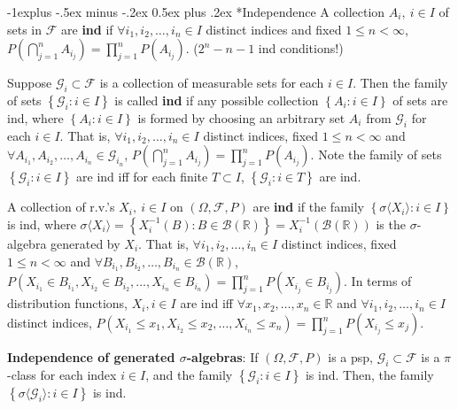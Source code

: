 \documentclass[paper=letter,fontsize=2.89mm]{scrartcl}
\makeatletter
\newcommand{\Borel}{\mathcal{B}}
\newcommand{\R}{\mathbb{R}}
\newcommand\set[1]{\left\{ #1 \right\}}
\renewcommand{\subsection}{\@startsection{subsection}{2}{0mm}%
                                {-1explus -.5ex minus -.2ex}%
                                {0.5ex plus .2ex}%
                                {\normalfont\normalsize\bfseries}}
\makeatother
\begin{document}
\begin{multicols*}{3}
\subsection*{Independence}
A collection $A_i, ~i \in I$ of sets in $\mathcal{F}$ are \textbf{ind} if $\forall i_1, i_2, \dots, i_n \in I$ distinct indices and fixed $1 \le n < \infty$,
$P\left(\bigcap_{j=1}^n A_{i_j}\right) = \prod_{j=1}^n P\left(A_{i_j}\right).$ ($2^n -n -1$ ind conditions!) \\ \medskip

Suppose $\mathcal{G}_i \subset \mathcal{F}$ is a collection of measurable sets for each $i \in I$. Then the family of sets $\set{\mathcal{G}_i : i \in I}$ is called \textbf{ind} if any possible collection $\set{A_i: i \in I}$ of sets are ind, where $\set{A_i:i \in I}$ is formed by choosing an arbitrary set $A_i$ from $\mathcal{G}_i$ for each $i \in I$. That is, $\forall i_1, i_2, \dots, i_n \in I$ distinct indices, fixed $1 \le n < \infty$ and $\forall A_{i_1}, A_{i_2}, \dots, A_{i_n} \in \mathcal{G}_{i_n}$, $P\left(\bigcap_{j=1}^n A_{i_j}\right) = \prod_{j=1}^n P\left(A_{i_j}\right).$ Note the family of sets $\set{\mathcal{G}_i: i \in I}$ are ind iff for each finite $T \subset I$, $\set{\mathcal{G}_i:i \in T}$ are ind. \\ \medskip

A collection of r.v.\@'s $X_i, ~i \in I$ on $(\Omega, \mathcal{F}, P)$ are \textbf{ind} if the family $\set{\sigma\langle X_i \rangle: i \in I}$ is ind, where 
$\sigma\langle X_i \rangle = \set{X_i^{-1}(B): B \in \Borel(\R)} = X_i^{-1} (\Borel(\R))$
is the $\sigma$-algebra generated by $X_i$. That is, $\forall i_1, i_2, \dots, i_n \in I$ distinct indices, fixed $1 \le n < \infty$ and $\forall B_{i_1}, B_{i_2}, \dots, B_{i_n} \in \Borel(\R)$,
$P\left(X_{i_1} \in B_{i_1}, X_{i_2} \in B_{i_2}, \dots, X_{i_n} \in B_{i_n}\right) = \prod_{j=1}^n P\left(X_{i_j}\in B_{i_j}\right).$
In terms of distribution functions, $X_i, i \in I$ are ind iff  $\forall x_1, x_2, \dots, x_n \in \R$ and $\forall i_1, i_2, \dots, i_n \in I$ distinct indices,
$P\left(X_{i_1} \le x_1, X_{i_2} \le x_2, \dots, X_{i_n} \le x_n \right) = \prod_{j=1}^n P\left(X_{i_j}\le x_j\right).$ \\ \medskip

\textbf{Independence of generated $\sigma$-algebras}: If $(\Omega, \mathcal{F}, P)$ is a psp, $\mathcal{G}_i \subset \mathcal{F}$ is a $\pi$-class for each index $i \in I$, and the family $\set{\mathcal{G}_i: i \in I}$ is ind. Then, the family 
$\set{\sigma\langle\mathcal{G}_i\rangle: i \in I}$ is ind. \\\medskip


\end{multicols*}
\end{document}
